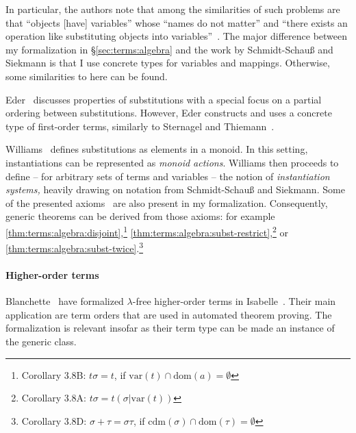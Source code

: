 In particular, the authors note that among the similarities of such problems are that ``objects [have] variables'' whose ``names do not matter'' and ``there exists an operation like substituting objects into variables''~\cite[§1]{schmidt1988unification}.
The major difference between my formalization in §\ref{sec:terms:algebra} and the work by Schmidt-Schauß and Siekmann is that I use concrete types for variables and mappings.
Otherwise, some similarities to here can be found.

Eder~\cite{eder1985properties} discusses properties of substitutions with a special focus on a partial ordering between substitutions.
However, Eder constructs and uses a concrete type of first-order terms, similarly to Sternagel and Thiemann~\cite{sternagel2018terms}.

Williams~\cite{williams1991instantiation} defines substitutions as elements in a monoid.
In this setting, instantiations can be represented as \emph{monoid actions}.
Williams then proceeds to define -- for arbitrary sets of terms and variables -- the notion of \emph{instantiation systems,} heavily drawing on notation from Schmidt-Schauß and Siekmann.
Some of the presented axioms~\cite[§2]{williams1991instantiation} are also present in my formalization.
Consequently, generic theorems can be derived from those axioms:
for example \cref{thm:terms:algebra:disjoint},\footnote{Corollary 3.8B: $t\sigma = t$, if $\mathrm{var}(t) \cap \mathrm{dom}(a) = \emptyset$}
\cref{thm:terms:algebra:subst-restrict},\footnote{Corollary 3.8A: $t\sigma = t(\sigma|\mathrm{var}(t))$} or
\cref{thm:terms:algebra:subst-twice}.\footnote{Corollary 3.8D: $\sigma + \tau = \sigma \tau$, if $\mathrm{cdm}(\sigma) \cap \mathrm{dom}(\tau) = \emptyset$}

\paragraph{Higher-order terms}
Blanchette \etal\ have formalized $\lambda$-free higher-order terms in Isabelle~\cite{becker2016lambda,blanchette2016lambda}.
Their main application are term orders that are used in automated theorem proving.
The formalization is relevant insofar as their term type can be made an instance of the generic  class.
